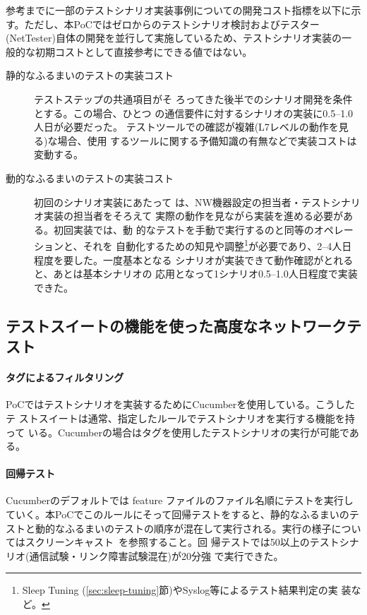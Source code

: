 参考までに一部のテストシナリオ実装事例についての開発コスト指標を以下に示
す。ただし、本PoCではゼロからのテストシナリオ検討およびテスター
(NetTester)自体の開発を並行して実施しているため、テストシナリオ実装の一
般的な初期コストとして直接参考にできる値ではない。
\begin{description}
 \item[静的なふるまいのテストの実装コスト] テストステップの共通項目がそ
            ろってきた後半でのシナリオ開発を条件とする。この場合、ひとつ
            の通信要件に対するシナリオの実装に0.5--1.0人日が必要だった。
            テストツールでの確認が複雑(L7レベルの動作を見る)な場合、使用
            するツールに関する予備知識の有無などで実装コストは変動する。
 \item[動的なふるまいのテストの実装コスト] 初回のシナリオ実装にあたって
            は、NW機器設定の担当者・テストシナリオ実装の担当者をそろえて
            実際の動作を見ながら実装を進める必要がある。初回実装では、動
            的なテストを手動で実行するのと同等のオペレーションと、それを
            自動化するための知見や調整\footnote{Sleep Tuning
            (\ref{sec:sleep-tuning}節)やSyslog等によるテスト結果判定の実
            装など。}が必要であり、2--4人日程度を要した。一度基本となる
            シナリオが実装できて動作確認がとれると、あとは基本シナリオの
            応用となって1シナリオ0.5--1.0人日程度で実装できた。
\end{description}

  \subsection{テストスイートの機能を使った高度なネットワークテスト}

    \paragraph{タグによるフィルタリング}
PoCではテストシナリオを実装するためにCucumberを使用している。こうしたテ
ストスイートは通常、指定したルールでテストシナリオを実行する機能を持って
いる。Cucumberの場合はタグを使用したテストシナリオの実行が可能である。

    \paragraph{回帰テスト}
Cucumberのデフォルトでは feature ファイルのファイル名順にテストを実行し
ていく。本PoCでこのルールにそって回帰テストをすると、静的なふるまいのテ
ストと動的なふるまいのテストの順序が混在して実行される。実行の様子につい
てはスクリーンキャスト~\cite{nettester-asciinema-full}を参照すること。回
帰テストでは50以上のテストシナリオ(通信試験・リンク障害試験混在)が20分強
で実行できた。

